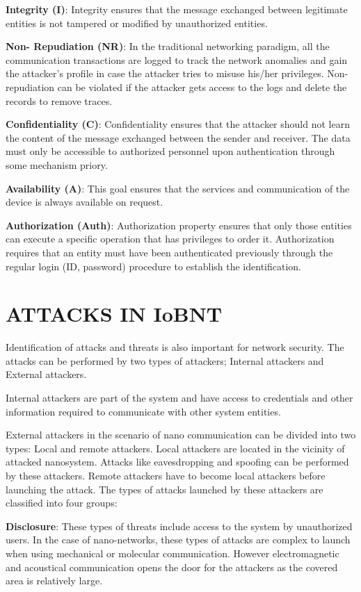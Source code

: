 \documentclass[12pt,a4paper]{report}
\begin{document}
\textbf{Integrity (I)}: Integrity ensures that the message 
exchanged between legitimate entities is not tampered or 
modified by unauthorized entities.

\textbf{Non- Repudiation (NR)}: In the traditional networking 
paradigm, all the communication transactions are logged to 
track the network anomalies and gain the attacker’s profile 
in case the attacker tries to misuse his/her privileges. 
Non-repudiation can be violated if the attacker gets access 
to the logs and delete the records to remove traces.

\textbf{Confidentiality (C)}: Confidentiality ensures that the 
attacker should not learn the content of the message exchanged 
between the sender and receiver. The data must only be accessible
 to authorized personnel upon authentication through some mechanism priory.

\textbf{Availability (A)}: This goal ensures that the services
 and communication of the device is always available on request.

\textbf{Authorization (Auth)}: Authorization property ensures 
that only those entities can execute a specific operation that
 has privileges to order it. Authorization requires that an 
 entity must have been authenticated previously through the 
 regular login (ID, password) procedure to establish the identification.

\chapter{ATTACKS IN IoBNT}
Identification of attacks and threats is also important for 
network security. The attacks can be performed by two types 
of attackers; Internal attackers and External attackers.

Internal attackers are part of the system and have access to 
credentials and other information required to communicate with 
other system entities.

External attackers in the scenario of nano communication can be
 divided into two types: Local and remote attackers. Local 
 attackers are located in the vicinity of attacked nanosystem.
 Attacks like eavesdropping and spoofing can be performed by 
 these attackers. Remote attackers have to become local attackers before launching the attack.
The types of attacks launched by these attackers are classified into four groups:

\textbf{Disclosure}: These types of threats include access to 
the system by unauthorized users. In the case of nano-networks,
 these types of attacks are complex to launch when using mechanical
 or molecular communication. However electromagnetic and acoustical
  communication opens the door for the attackers as the covered 
  area is relatively large.
\end{document}
